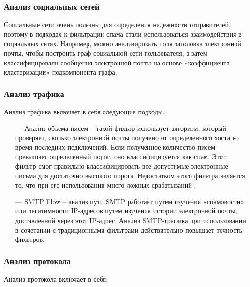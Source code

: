 \subsubsection{Анализ социальных сетей}
Социальные сети очень полезны для определения
надежности отправителей, поэтому в подходах к фильтрации спама стали использоваться
взаимодействия в социальных сетях. Например, можно анализировать поля заголовка
электронной почты, чтобы построить граф социальной сети пользователя, а затем классифицировали
сообщения электронной почты на основе «коэффициента кластеризации» подкомпонента графа;

\subsubsection{Анализ трафика}

Анализ трафика включает в себя следующие подходы:

\begin{itemize}
    \item[—] Анализ объема писем -- такой фильтр использует алгоритм, который проверяет,
        сколько электронной почты получено от определенного хоста во время последних
        подключений. Если полученное количество писем превышает определенный порог,
        оно классифицируется как спам. Этот фильтр смог правильно классифицировать
        все допустимые электронные письма для достаточно высокого порога. Недостатком
        этого фильтра является то, что при его использовании много ложных срабатываний \cite{IFIP};
    \item[—] SMTP Flow -- анализ пути SMTP работает путем изучения «спамовости» или легитимности
        IP-адресов путем изучения истории электронной почты, доставленной через этот IP-адрес.
        Анализ SMTP-трафика при использовании в сочетании с традиционными фильтрами
        действительно повышает точность фильтров.
\end{itemize}

\subsubsection{Анализ протокола}

Анализ протокола включает в себя:

